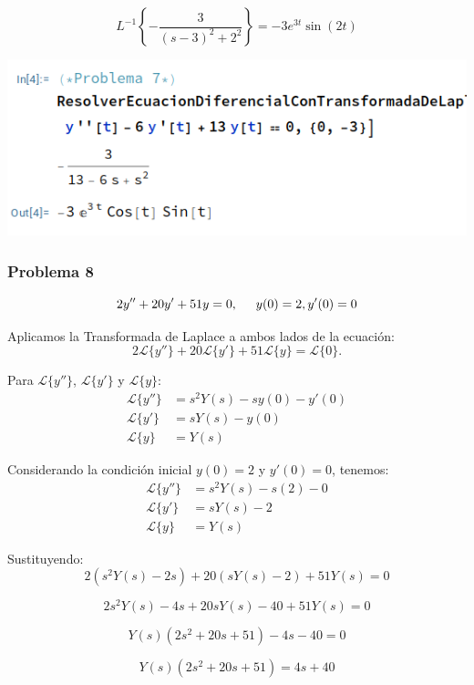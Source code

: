 \documentclass{article}
\begin{document}
\[
    L^{-1}\left\{-\frac{3}{(s-3)^2 + 2^2}\right\} = -3e^{3t} \sin(2t)
\]

\begin{center}
    \includegraphics[width=1\textwidth]{../ED 2/image8.png}
\end{center}

\newpage

\subsubsection{Problema 8}
\[2y'' + 20y' + 51y = 0, \hspace{.5cm} y(0) = 2, y'(0) = 0\]

Aplicamos la Transformada de Laplace a ambos lados de la ecuación:
\[
    2\mathcal{L}\{y''\} + 20\mathcal{L}\{y'\} + 51\mathcal{L}\{y\} = \mathcal{L}\{0\}.
\]

Para \(\mathcal{L}\{y''\}\), \(\mathcal{L}\{y'\}\) y \(\mathcal{L}\{y\}\):
\begin{align*}
    \mathcal{L}\{y''\} & = s^2Y(s) - sy(0) - y'(0) \\
    \mathcal{L}\{y'\}  & = sY(s) - y(0)            \\
    \mathcal{L}\{y\}   & = Y(s)
\end{align*}

Considerando la condición inicial $y(0) = 2$ y $y'(0) = 0$, tenemos:
\begin{align*}
    \mathcal{L}\{y''\} & = s^2Y(s) - s(2) - 0 \\
    \mathcal{L}\{y'\}  & = sY(s) - 2          \\
    \mathcal{L}\{y\}   & = Y(s)
\end{align*}

Sustituyendo:
\[
    2(s^2Y(s) - 2s) + 20(sY(s) - 2) + 51Y(s) = 0
\]

\[
    2s^2Y(s) - 4s + 20sY(s) - 40 + 51Y(s) = 0
\]

\[
    Y(s)(2s^2 + 20s + 51) - 4s - 40 = 0
\]

\[
    Y(s)(2s^2 + 20s + 51) = 4s + 40
\]
\end{document}

